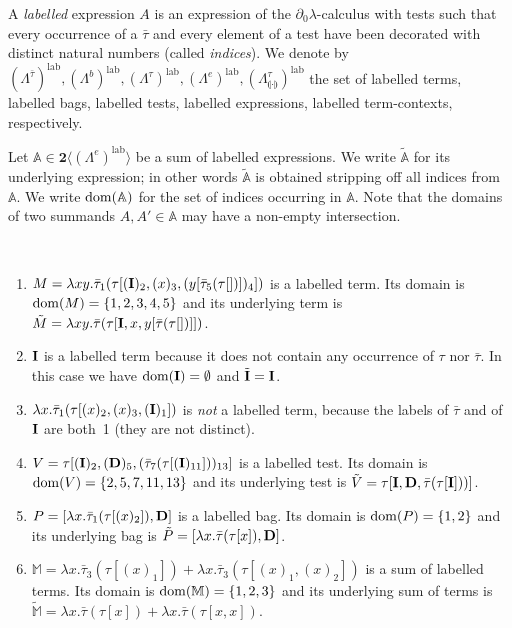 \documentclass{LMCS}
\newcommand{\nak}[1]{\tilde{#1}}
\newcommand{\bool}{\mathbf{2}}
\newcommand{\dzlam}{\ensuremath{\partial_0\lambda}}
\newcommand{\lam}{\ensuremath{\lambda}}
\renewcommand{\hole}[1]{\llparenthesis #1\rrparenthesis}
\newcommand{\Set}[1]{\Lambda^{#1}}
\newcommand{\sA}{\mathbb{A}}
\newcommand{\sM}{\mathbb{M}}
\newcommand{\gt}{\ensuremath{\tau}}
\newcommand{\gto}{\ensuremath{\bar\tau}}
\newcommand\lab{\mathrm{lab}}
\begin{document}
\begin{defi}
A \emph{labelled} expression $A$ is an expression of the \dzlam-calculus with tests such that 
every occurrence of a $\gto$ and every element of a test have been decorated with distinct natural numbers (called \emph{indices}).
We denote by $(\Set{\gto})^\lab,(\Set{b})^\lab,(\Set{\gt})^\lab,(\Set{e})^\lab,(\Set{\gt}_{\hole{\cdot}})^\lab$ 
the set of labelled terms, labelled bags, labelled tests, labelled expressions, labelled term-contexts, respectively.
\end{defi}

Let $\sA\in\bool\langle(\Set{e})^\lab\rangle$ be a sum of labelled expressions. 
We write $\nak{\sA}$ for its underlying expression;
in other words $\nak{\sA}$ is obtained stripping off all indices from $\sA$.
We write $\dom(\sA)$ for the set of indices occurring in $\sA$.
Note that the domains of two summands $A,A'\in\sA$ may have a non-empty intersection. 

\begin{exa}\label{ex:labelled} \ 
\begin{enumerate}[1.]
\item\label{ex:labelled1} $M = \lam xy.\gto_{1}(\gt[(\bold{I})_2,(x)_3, (y[\gto_5(\gt[])])_4])$ is a labelled term. 
Its domain is $\mathrm{dom}(M) = \{ 1,2,3,4,5\}$ and its underlying term is $\nak M = \lam xy.\gto(\gt[\bold{I},x, y[\gto(\gt[])]])$.
\item\label{ex:labelled2} $\bold{I}$ is a labelled term because it does not contain any occurrence of $\gt$ nor $\gto$. 
In this case we have $\mathrm{dom}(\bold{I}) = \emptyset$ and $\nak{\bold{I}} = \bold{I}$.
\item\label{ex:labelled3} $\lam x.\gto_1(\gt[(x)_2,(x)_3,(\bold{I})_1])$ is \emph{not} a labelled term, because the labels of $\gto$ and of $\bold{I}$ are both~1 
(they are not distinct).
\item\label{ex:labelled4} $V = \gt[(\bold{I})_2,(\bold{D})_5,(\gto_{7}(\gt[(\bold{I})_{11}]))_{13}]$ is a labelled test. 
Its domain is $\mathrm{dom}(V) = \{2,5,7,11,13\}$ and its underlying test is $\nak V = \gt[\bold{I},\bold{D},\gto(\gt[\bold{I}]))]$.
\item\label{ex:labelled5} $P = [ \lam x.\gto_1(\gt[(x)_2]),\bold{D}]$ is a labelled bag.
Its domain is $\mathrm{dom}(P) = \{1,2\}$ and its underlying bag is $\nak P =  [\lam x.\gto(\gt[x]),\bold{D}]$.
\item\label{ex:labelled6} 
$\sM = \lam x.\gto_3(\gt[(x)_1]) + \lam x.\gto_3(\gt[(x)_1,(x)_2])$ is a sum of labelled terms. 
Its domain is $\dom(\sM) = \{1,2,3\}$ and its underlying sum of terms is $\nak {\sM} =  \lam x.\gto(\gt[x]) + \lam x.\gto(\gt[x,x])$.
\end{enumerate}
\end{exa}
\end{document}

